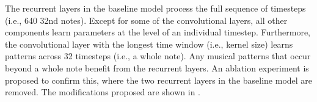 
The recurrent layers in the baseline model process the full
sequence of timesteps (i.e., 640 \gls{32nd} notes). Except
for some of the convolutional layers, all other components
learn parameters at the level of an individual timestep.
Furthermore, the convolutional layer with the longest time
window (i.e., kernel size) learns patterns across 32
timesteps (i.e., a \gls{whole} note). Any musical patterns
that occur beyond a \gls{whole} note benefit from the
recurrent layers. An ablation experiment is proposed to
confirm this, where the two recurrent layers in the baseline
model are removed. The modifications proposed are shown in
.

